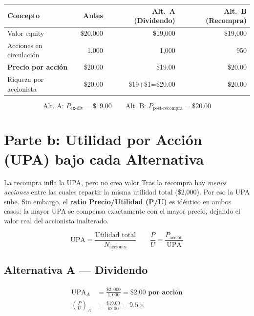 \documentclass[12pt,a4paper]{article}
\begin{document}
\begin{center}
\begin{tabular}{lrrr}
\toprule
\textbf{Concepto} & \textbf{Antes} & \textbf{Alt.\ A (Dividendo)} & \textbf{Alt.\ B (Recompra)} \\
\midrule
Valor equity           & \$20{,}000 & \$19{,}000 & \$19{,}000 \\
Acciones en circulaci\'on & 1{,}000  & 1{,}000    & 950        \\
\textbf{Precio por acci\'on} & \$20.00 & \$19.00  & \$20.00    \\
Riqueza por accionista & \$20.00    & \$19+\$1=\$20.00 & \$20.00 \\
\bottomrule
\end{tabular}
\end{center}

\[
\boxed{
\text{Alt.\ A: } P_{\text{ex-div}} = \$19.00
\qquad
\text{Alt.\ B: } P_{\text{post-recompra}} = \$20.00
}
\]

\vspace{1cm}

\section{Parte b: Utilidad por Acci\'on (UPA) bajo cada Alternativa}

\begin{cajaintuicion}{La recompra infla la UPA, pero no crea valor}
Tras la recompra hay \emph{menos acciones} entre las cuales repartir la misma
utilidad total (\$2{,}000). Por eso la UPA sube. Sin embargo, el \textbf{ratio
Precio/Utilidad (P/U)} es id\'entico en ambos casos: la mayor UPA se compensa
exactamente con el mayor precio, dejando el valor real del accionista inalterado.
\end{cajaintuicion}

\begin{cajaformula}
\[
\text{UPA} = \frac{\text{Utilidad total}}{N_{\text{acciones}}}
\qquad
\frac{P}{U} = \frac{P_{\text{acci\'on}}}{\text{UPA}}
\]
\end{cajaformula}

\subsection*{Alternativa A --- Dividendo}

\begin{align}
\text{UPA}_A &= \frac{\$2{,}000}{1{,}000} = \mathbf{\$2.00 \text{ por acci\'on}} \\[8pt]
\left(\frac{P}{U}\right)_A &= \frac{\$19.00}{\$2.00} = \mathbf{9.5\times}
\end{align}
\end{document}
